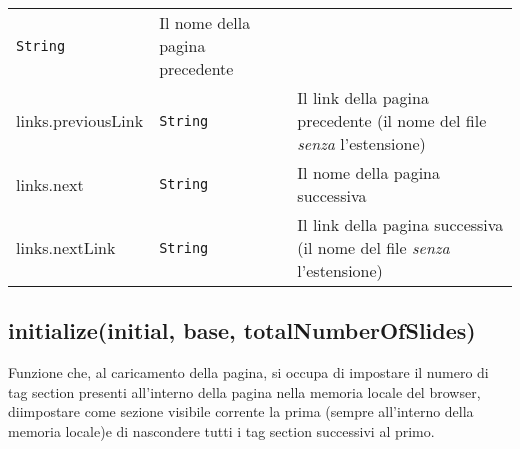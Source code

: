 \begin{tabularx}{\textwidth}{XXX}
\begin{minipage}[t]{0.30\columnwidth}
\texttt{String}\strut
\end{minipage} & \begin{minipage}[t]{0.30\columnwidth}\raggedright
Il nome della pagina precedente\strut
\end{minipage}\tabularnewline
\begin{minipage}[t]{0.30\columnwidth}\raggedright
links.previousLink\strut
\end{minipage} & \begin{minipage}[t]{0.30\columnwidth}\raggedright
\texttt{String}\strut
\end{minipage} & \begin{minipage}[t]{0.30\columnwidth}\raggedright
Il link della pagina precedente (il nome del file \emph{senza}
l'estensione)\strut
\end{minipage}\tabularnewline
\begin{minipage}[t]{0.30\columnwidth}\raggedright
links.next\strut
\end{minipage} & \begin{minipage}[t]{0.30\columnwidth}\raggedright
\texttt{String}\strut
\end{minipage} & \begin{minipage}[t]{0.30\columnwidth}\raggedright
Il nome della pagina successiva\strut
\end{minipage}\tabularnewline
\begin{minipage}[t]{0.30\columnwidth}\raggedright
links.nextLink\strut
\end{minipage} & \begin{minipage}[t]{0.30\columnwidth}\raggedright
\texttt{String}\strut
\end{minipage} & \begin{minipage}[t]{0.30\columnwidth}\raggedright
Il link della pagina successiva (il nome del file \emph{senza}
l'estensione)\strut
\end{minipage}\tabularnewline
\bottomrule
\end{tabularx}

\protect\hypertarget{initialize}{}{}

\hypertarget{initializeinitial-base-totalnumberofslides}{%
\subsection{initialize(initial, base,
totalNumberOfSlides)}\label{initializeinitial-base-totalnumberofslides}}

Funzione che, al caricamento della pagina, si occupa di impostare il
numero di tag section presenti all'interno della pagina nella memoria
locale del browser, diimpostare come sezione visibile corrente la prima
(sempre all'interno della memoria locale)e di nascondere tutti i tag
section successivi al primo.


